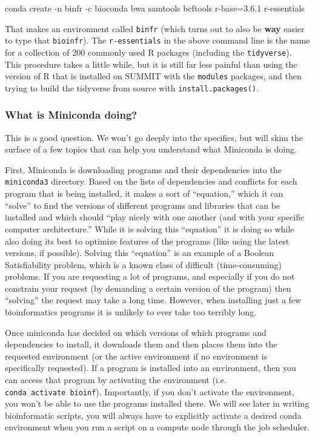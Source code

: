 \documentclass[]{krantz}
\makeatletter
\newenvironment{Shaded}{\begin{snugshade}}{\end{snugshade}}
\newcommand{\ExtensionTok}[1]{#1}
\newcommand{\NormalTok}[1]{#1}
\newenvironment{kframe}{%
\medskip{}
\setlength{\fboxsep}{.8em}
 \def\at@end@of@kframe{}%
 \ifinner\ifhmode%
  \def\at@end@of@kframe{\end{minipage}}%
  \begin{minipage}{\columnwidth}%
 \fi\fi%
 \def\FrameCommand##1{\hskip\@totalleftmargin \hskip-\fboxsep
 \colorbox{shadecolor}{##1}\hskip-\fboxsep
     \hskip-\linewidth \hskip-\@totalleftmargin \hskip\columnwidth}%
 \MakeFramed {\advance\hsize-\width
   \@totalleftmargin\z@ \linewidth\hsize
   \@setminipage}}%
 {\par\unskip\endMakeFramed%
 \at@end@of@kframe}
\renewenvironment{Shaded}{\begin{kframe}}{\end{kframe}}
\makeatother
\begin{document}
\begin{Shaded}
\begin{Highlighting}[]
\ExtensionTok{conda}\NormalTok{ create -n binfr -c bioconda bwa samtools bcftools r-base=3.6.1 r-essentials}
\end{Highlighting}
\end{Shaded}

That makes an environment called \texttt{binfr} (which turns out to also be \textbf{way} easier to type that \texttt{bioinfr}).
The \texttt{r-essentials} in the above command line is the name for a collection of 200 commonly used R packages (including
the \texttt{tidyverse}). This procedure takes a little while, but it is still far less painful than using the
version of R that is installed on SUMMIT with the \texttt{modules} packages, and then trying to build the tidyverse
from source with \texttt{install.packages()}.

\hypertarget{what-is-miniconda-doing}{%
\subsubsection{What is Miniconda doing?}\label{what-is-miniconda-doing}}

This is a good question. We won't go deeply into the specifics, but will skim the
surface of a few topics that can help you understand what Miniconda is doing.

First, Miniconda is downloading programs and their dependencies into the \texttt{miniconda3}
directory. Based on the lists of dependencies and conflicts for each program that is being
installed, it makes a sort of ``equation,'' which it can ``solve'' to find the versions of
different programs and libraries that can be installed and which should ``play nicely with
one another (and with your specific computer architecture.'' While it is solving this
``equation'' it is doing so while also doing its best
to optimize features of the programs (like using the latest versions, if possible).
Solving this ``equation'' is an example of a Boolean Satisfiability problem, which is a known
class of difficult (time-consuming) problems. If you are requesting a lot of programs, and
especially if you do not constrain your request (by demanding a certain version of
the program) then ``solving'' the request may take a long time. However, when installing
just a few bioinformatics programs it is unlikely to ever take too terribly long.

Once miniconda has decided on which versions of which programs and dependencies to install,
it downloads them and then places them into the requested environment (or the active environment
if no environment is specifically requested). If a program is installed into an environment, then you
can access that program by activating the environment (i.e. \texttt{conda\ activate\ bioinf}). Importantly,
if you don't activate the environment, you won't be able to use the programs installed there.
We will see later in writing bioinformatic scripts, you will always have to explicitly
activate a desired conda environment when you run a script on a compute node through the job
scheduler.
\end{document}
